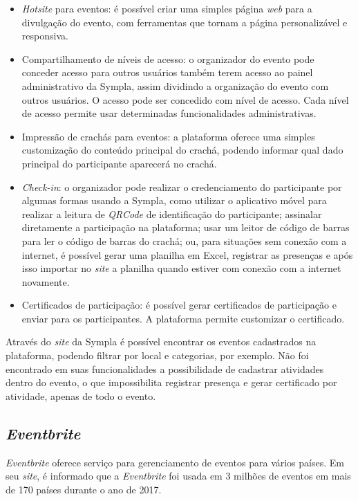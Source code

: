 \begin{itemize}
    \item \textit{Hotsite} para eventos: é possível criar uma simples página \textit{web} para a divulgação do evento, com ferramentas que tornam a página personalizável e responsiva.
    \item Compartilhamento de níveis de acesso: o organizador do evento pode conceder acesso para outros usuários também terem acesso ao painel administrativo da Sympla, assim dividindo a organização do evento com outros usuários. O acesso pode ser concedido com nível de acesso. Cada nível de acesso permite usar determinadas funcionalidades administrativas.
    \item Impressão de crachás para eventos: a plataforma oferece uma simples customização do conteúdo principal do crachá, podendo informar qual dado principal do participante aparecerá no crachá.
    \item \textit{Check-in}: o organizador pode realizar o credenciamento do participante por algumas formas usando a Sympla, como utilizar o aplicativo móvel para realizar a leitura de \textit{QRCode} de identificação do participante; assinalar diretamente a participação na plataforma; usar um leitor de código de barras para ler o código de barras do crachá; ou, para situações sem conexão com a internet, é possível gerar uma planilha em Excel, registrar as presenças e após isso importar no \textit{site} a planilha quando estiver com conexão com a internet novamente.
    \item Certificados de participação: é possível gerar certificados de participação e enviar para os participantes. A plataforma permite customizar o certificado.
\end{itemize}

Através do \textit{site} da Sympla é possível encontrar os eventos cadastrados na plataforma, podendo filtrar por local e categorias, por exemplo. Não foi encontrado em suas funcionalidades a possibilidade de cadastrar atividades dentro do evento, o que impossibilita registrar presença e gerar certificado por atividade, apenas de todo o evento.

\subsection{\textit{Eventbrite}}

\textit{Eventbrite} oferece serviço para gerenciamento de eventos para vários países. Em seu \textit{site}, é informado que a \textit{Eventbrite} foi usada em 3 milhões de eventos em mais de 170 países durante o ano de 2017.

